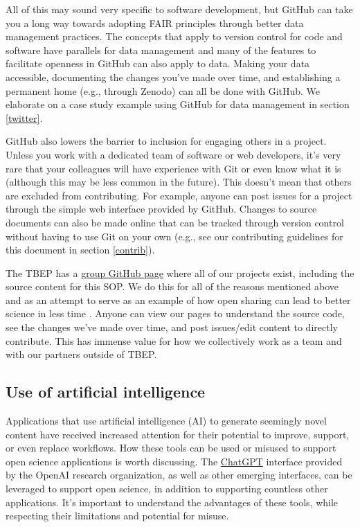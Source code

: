 \documentclass[
]{book}
\begin{document}
All of this may sound very specific to software development, but GitHub can take you a long way towards adopting FAIR principles through better data management practices. The concepts that apply to version control for code and software have parallels for data management and many of the features to facilitate openness in GitHub can also apply to data. Making your data accessible, documenting the changes you've made over time, and establishing a permanent home (e.g., through Zenodo) can all be done with GitHub. We elaborate on a case study example using GitHub for data management in section \ref{twitter}.

GitHub also lowers the barrier to inclusion for engaging others in a project. Unless you work with a dedicated team of software or web developers, it's very rare that your colleagues will have experience with Git or even know what it is (although this may be less common in the future). This doesn't mean that others are excluded from contributing. For example, anyone can post issues for a project through the simple web interface provided by GitHub. Changes to source documents can also be made online that can be tracked through version control without having to use Git on your own (e.g., see our contributing guidelines for this document in section \ref{contrib}).

The TBEP has a \href{https://github.com/tbep-tech}{group GitHub page} where all of our projects exist, including the source content for this SOP. We do this for all of the reasons mentioned above and as an attempt to serve as an example of how open sharing can lead to better science in less time \citep{Lowndes17}. Anyone can view our pages to understand the source code, see the changes we've made over time, and post issues/edit content to directly contribute. This has immense value for how we collectively work as a team and with our partners outside of TBEP.

\subsection{Use of artificial intelligence}\label{aiuse}

Applications that use artificial intelligence (AI) to generate seemingly novel content have received increased attention for their potential to improve, support, or even replace workflows. How these tools can be used or misused to support open science applications is worth discussing. The \href{https://chat.openai.com/}{ChatGPT} interface provided by the OpenAI research organization, as well as other emerging interfaces, can be leveraged to support open science, in addition to supporting countless other applications. It's important to understand the advantages of these tools, while respecting their limitations and potential for misuse.
\end{document}
